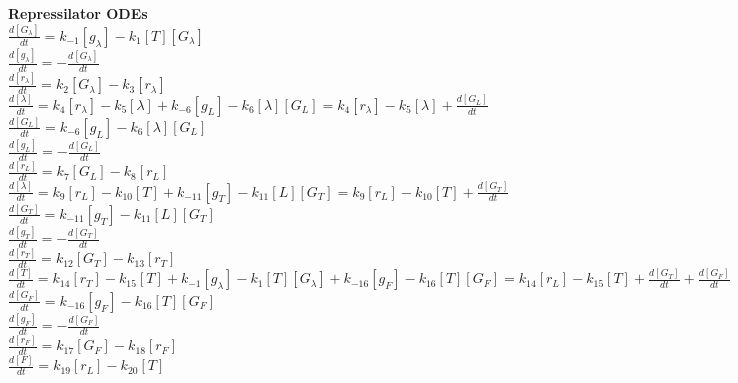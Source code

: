 \documentclass[10pt,oneside]{article}
\begin{document}
\textbf{Repressilator ODEs} \\

 $\frac{d[G_{\lambda}]}{dt} = k_{-1}[g_{\lambda}] - k_{1}[T][G_{\lambda}]$\\
 
 $\frac{d[g_{\lambda}]}{dt} = -\frac{d[G_{\lambda}]}{dt}$\\
 
 $\frac{d[r_{\lambda}]}{dt} = k_{2}[G_{\lambda}] - k_{3}[r_{\lambda}]$\\
 
 $\frac{d[\lambda]}{dt} = k_{4}[r_{\lambda}] - k_{5}[\lambda] + k_{-6}[g_{L}] - k_{6}[\lambda][G_{L}] = k_{4}[r_{\lambda}] - k_{5}[\lambda] + \frac{d[G_{L}]}{dt}$\\
 
 $\frac{d[G_{L}]}{dt} = k_{-6}[g_{L}] - k_{6}[\lambda][G_{L}]$\\
 
 $\frac{d[g_{L}]}{dt} = -\frac{d[G_{L}]}{dt}$\\
 
 $\frac{d[r_{L}]}{dt} = k_{7}[G_{L}] - k_{8}[r_{L}]$\\
 
 $\frac{d[\lambda]}{dt} = k_{9}[r_{L}] - k_{10}[T] + k_{-11}[g_{T}] - k_{11}[L][G_{T}] = k_{9}[r_{L}] - k_{10}[T] + \frac{d[G_{T}]}{dt} $\\
 
 $\frac{d[G_{T}]}{dt} = k_{-11}[g_{T}] - k_{11}[L][G_{T}]$\\
 
 $\frac{d[g_{T}]}{dt} = -\frac{d[G_{T}]}{dt}$\\
 
 $\frac{d[r_{T}]}{dt} = k_{12}[G_{T}] - k_{13}[r_{T}]$\\
 
 $\frac{d[T]}{dt} = k_{14}[r_{T}] - k_{15}[T] + k_{-1}[g_{\lambda}] - k_{1}[T][G_{\lambda}] + k_{-16}[g_{F}] - k_{16}[T][G_{F}]= k_{14}[r_{L}] - k_{15}[T] + \frac{d[G_{T}]}{dt} + \frac{d[G_{F}]}{dt}$\\
 
 $\frac{d[G_{F}]}{dt} = k_{-16}[g_{F}] - k_{16}[T][G_{F}]$\\
 
 $\frac{d[g_{F}]}{dt} = -\frac{d[G_{F}]}{dt}$\\
 
 $\frac{d[r_{F}]}{dt} = k_{17}[G_{F}] - k_{18}[r_{F}]$\\
 
 $\frac{d[F]}{dt} = k_{19}[r_{L}] - k_{20}[T]$\\
 
\end{document}
